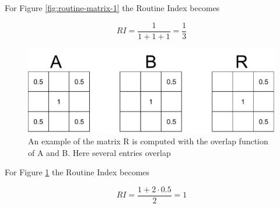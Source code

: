 For Figure \ref{fig:routine-matrix-1} the Routine Index becomes 

\begin{equation}
RI = \frac{1}{1 + 1 + 1} = \frac{1}{3}
\end{equation}

\begin{figure}[h]
    \centering
    \includegraphics[width=\textwidth]{images/routine-numbers-2.pdf}
        \caption{An example of the matrix R is computed with the overlap function of A and B. Here several entries overlap}
    \label{fig:routine-matrix-2}
\end{figure}

For Figure \ref{fig:routine-matrix-2} the Routine Index becomes

\begin{equation}
RI = \frac{1 + 2\cdot 0.5}{2} = 1
\end{equation}

